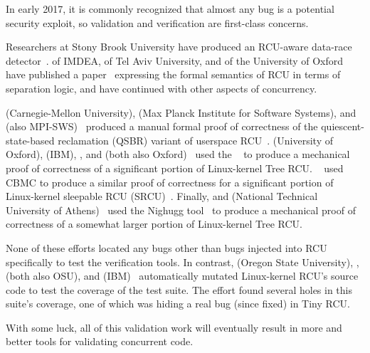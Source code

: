 In early 2017, it is commonly recognized that almost any bug is a potential
security exploit, so validation and verification are first-class concerns.

Researchers at Stony Brook University have produced an RCU-aware data-race
detector~\cite{AbhinavDuggal2010Masters,JustinSeyster2012PhD,Seyster:2011:RFA:2075416.2075425}.
 of IMDEA,  of Tel Aviv University,
and  of the University of Oxford have published a
paper~\cite{AlexeyGotsman2012VerifyGraceExtended} expressing the formal
semantics of RCU in terms of separation logic, and have continued with
other aspects of concurrency.

 (Carnegie-Mellon University),  (Max
Planck Institute for Software Systems), and 
(also MPI-SWS)~\cite{JosephTassarotti2015RCUproof}
produced a manual formal proof of correctness of the quiescent-state-based
reclamation (QSBR) variant of userspace
RCU~\cite{MathieuDesnoyers2009URCU,MathieuDesnoyers2012URCU}.
 (University of Oxford),  (IBM),
, and 
(both also Oxford)~\cite{LihaoLiang2016VerifyTreeRCU}
used the ~\cite{EdmundClarke2004CBMC}
to produce a mechanical proof of correctness of a significant portion
of Linux-kernel Tree RCU\@.
~\cite{LanceRoy2017CBMC-SRCU} used CBMC to produce a similar
proof of correctness for a significant portion of Linux-kernel
sleepable RCU (SRCU)~\cite{PaulEMcKenney2006c}.
Finally,  and 
(National Technical University of
Athens)~\cite{MichalisKokologiannakis2017NidhuggRCU,MichalisKokologiannakis2019RCUstatelessModelCheck}
used the Nighugg tool~\cite{CarlLeonardsson2014Nidhugg}
to produce a mechanical proof of correctness of a somewhat larger
portion of Linux-kernel Tree RCU\@.

None of these efforts located any bugs other than bugs injected into
RCU specifically to test the verification tools.
In contrast,
 (Oregon State University), ,
 (both also OSU), and 
(IBM)~\cite{Groce:2015:VMC:2916135.2916190}
automatically mutated Linux-kernel RCU's source code to test the
coverage of the  test suite.
The effort found several holes in this suite's coverage, one of which
was hiding a real bug (since fixed) in Tiny RCU\@.

With some luck, all of this validation work will eventually result in
more and better tools for validating concurrent code.
